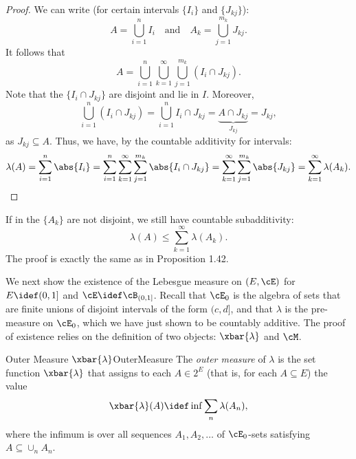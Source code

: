 \begin{proof}
	We can write (for certain intervals $\{I_i\}$ and $\{J_{kj}\}$):
	\begin{equation*}
		A = \bigcup_{i=1}^n I_i \quad \text{and} \quad A_k = \bigcup_{j=1}^{m_k} J_{kj}.
	\end{equation*}
	It follows that
	\begin{equation*}
		A = \bigcup_{i=1}^n \bigcup_{k=1}^\infty \bigcup_{j=1}^{m_k} (I_i \cap J_{kj}).
	\end{equation*}
	Note that the $\{I_i \cap J_{kj}\}$ are disjoint and lie in $I$. Moreover,
	\begin{equation*}
		\bigcup_{i=1}^n (I_i \cap J_{kj}) = \bigcup_{i=1}^n I_i \cap J_{kj} = \underbrace{A \cap J_{kj}}_{J_{kj}} = J_{kj},
	\end{equation*}
	as $J_{kj} \subseteq A$. Thus, we have, by the countable additivity for intervals:
	\begin{equation*}
		\lambda(A) = \sum_{i=1}^n \abs{I_i} = \sum_{i=1}^n \sum_{k=1}^\infty \sum_{j=1}^{m_k} \abs{I_i \cap J_{kj}} = \sum_{k=1}^\infty \sum_{j=1}^{m_k} \abs{J_{kj}} = \sum_{k=1}^\infty \lambda(A_k).
	\end{equation*}
\end{proof}

If in  the $\{A_k\}$ are not disjoint, we still have countable subadditivity:
\begin{equation}
	\lambda(A) \le \sum_{k=1}^\infty \lambda(A_k).
	\label{eq:IntervalSubadditivity}
\end{equation}
The proof is exactly the same as in Proposition 1.42.

We next show the existence of the Lebesgue measure on $(E, \cE)$ for $E \idef (0, 1]$ and $\cE \idef \cB_{(0,1]}$. Recall that $\cE_0$ is the algebra of sets that are finite unions of disjoint intervals of the form $(c, d]$, and that $\lambda$ is the pre-measure on $\cE_0$, which we have just shown to be countably additive. The proof of existence relies on the definition of two objects: $\xbar{\lambda}$ and $\cM$.

\begin{defn}{Outer Measure $\xbar{\lambda}$}{OuterMeasure}
	The \textit{outer measure} of $\lambda$ is the set function $\xbar{\lambda}$ that assigns to each $A \in 2^E$ (that is, for each $A \subseteq E$) the value
	\begin{equation}
		\xbar{\lambda}(A) \idef \inf \sum_n \lambda(A_n),
		\label{eq:OuterMeasureDef}
	\end{equation}
	where the infimum is over all sequences $A_1, A_2, \dots$ of $\cE_0$-sets satisfying $A \subseteq \cup_n A_n$.
\end{defn}

